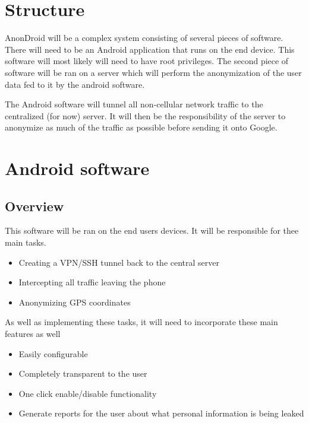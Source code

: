 \documentclass[a4paper]{article}
\begin{document}
\section{Structure}

AnonDroid will be a complex system consisting of several pieces of software.
There will need to be an Android application that runs on the end device. This
software will most likely will need to have root privileges. The second piece
of software will be ran on a server which will perform the anonymization of the
user data fed to it by the android software.

The Android software will tunnel all non-cellular network traffic to the centralized (for now) server. It will then be the responsibility of the server to
anonymize as much of the traffic as possible before sending it onto Google.

\section{Android software}

\subsection{Overview}

This software will be ran on the end users devices. It will be responsible for
thee main tasks. 

\begin{itemize}
  \item Creating a VPN/SSH tunnel back to the central server
  \item Intercepting all traffic leaving the phone
  \item Anonymizing GPS coordinates 
\end{itemize}

\hspace{-0.65cm}
As well as implementing these tasks, it will need to incorporate these main
features as well

\begin{itemize}
  \item Easily configurable
  \item Completely transparent to the user
  \item One click enable/disable functionality
  \item Generate reports for the user about what personal information is being
    leaked 
\end{itemize}
\end{document}
